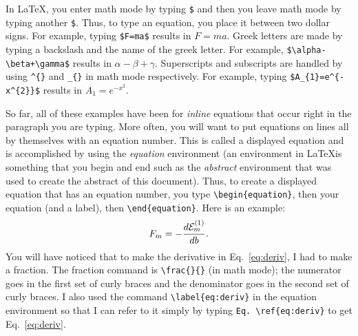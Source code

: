 \documentclass[preprint,pre,floats,aps,amsmath,amssymb]{revtex4}
\begin{document}
In \LaTeX, you enter math mode by typing \verb!$! and then you leave math mode by typing another \verb!$!. Thus, to type an equation, you place it between two dollar signs. For example, typing \verb!$F=ma$! results in $F=ma$. Greek letters are made by typing a backslash and the name of the greek letter. For example, \verb!$\alpha-\beta+\gamma$! results in $\alpha-\beta+\gamma$. Superscripts and subscripts are handled by using \verb!^{}! and \verb!_{}! in math mode respectively. For example, typing \verb!$A_{1}=e^{-x^{2}}$! results in $A_{1}=e^{-x^{2}}$.

So far, all of these examples have been for \textit{inline} equations that occur right in the paragraph you are typing. More often, you will want to put equations on lines all by themselves with an equation number. This is called a displayed equation and is accomplished by using the \textit{equation} environment (an environment in \LaTeX is something that you begin and end such as the \textit{abstract} environment that was used to create the abstract of this document). Thus, to create a displayed equation that has an equation number, you type \verb!\begin{equation}!, then your equation (and a label), then \verb!\end{equation}!. Here is an example:
\begin{equation}
F_m = -\frac{d{\cal E}_m^{(1)} }{db}.
\label{eq:deriv}
\end{equation}
You will have noticed that to make the derivative in Eq.~\ref{eq:deriv}, I had to make a fraction. The fraction command is \verb!\frac{}{}! (in math mode); the numerator goes in the first set of curly braces and the denominator goes in the second set of curly braces. I also used the command \verb!\label{eq:deriv}! in the equation environment so that I can refer to it simply by typing \verb!Eq. \ref{eq:deriv}! to get Eq.~\ref{eq:deriv}.
\end{document}
